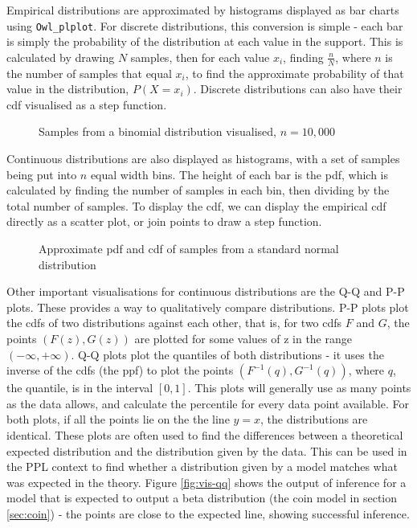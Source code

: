 \documentclass[sigconf]{acmart}
\begin{document}
Empirical distributions are approximated by histograms displayed as bar charts using \texttt{Owl\_plplot}. For discrete distributions, this conversion is simple - each bar is simply the probability of the distribution at each value in the support. This is calculated by drawing $N$ samples, then for each value $x_i$, finding $\frac{n}{N}$, where $n$ is the number of samples that equal $x_i$, to find the approximate probability of that value in the distribution, $P(X = x_i)$. Discrete distributions can also have their cdf visualised as a step function.

\begin{figure}[!htb]
  \centering
  \qquad
  \caption{Samples from a binomial distribution visualised, $n=10,000$}
  \label{fig:vis-binom}
\end{figure}

Continuous distributions are also displayed as histograms, with a set of samples being put into $n$ equal width bins. The height of each bar is the pdf, which is calculated by finding the number of samples in each bin, then dividing by the total number of samples. To display the cdf, we can display the empirical cdf directly as a scatter plot, or join points to draw a step function.

\begin{figure}[!htb]
  \centering
  \qquad
  \caption{Approximate pdf and cdf of samples from a standard normal distribution}
  \label{fig:vis-norm}
\end{figure}

Other important visualisations for continuous distributions are the Q-Q and P-P plots. These provides a way to qualitatively compare distributions. P-P plots plot the cdfs of two distributions against each other, that is, for two cdfs $F$ and $G$, the points $(F(z), G(z))$ are plotted for some values of z in the range $(-\infty,+\infty)$. Q-Q plots plot the quantiles of both distributions - it uses the inverse of the cdfs (the ppf) to plot the points $(F^{-1}(q), G^{-1}(q))$, where $q$, the quantile, is in the interval $[0,1]$. This plots will generally use as many points as the data allows, and calculate the percentile for every data point available. For both plots, if all the points lie on the the line $y=x$, the distributions are identical. These plots are often used to find the differences between a theoretical expected distribution and the distribution given by the data. This can be used in the PPL context to find whether a distribution given by a model matches what was expected in the theory. Figure \ref{fig:vis-qq} shows the output of inference for a model that is expected to output a beta distribution (the coin model in section \ref{sec:coin}) - the points are close to the expected line, showing successful inference.
\end{document}

